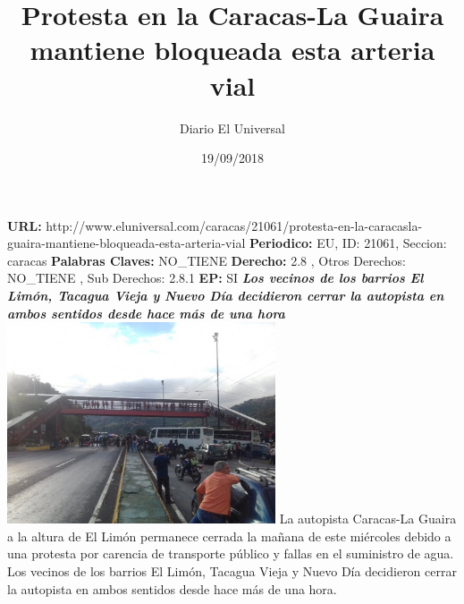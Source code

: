 \documentclass{article}%
\title{\textbf{Protesta en la Caracas{-}La Guaira mantiene bloqueada esta arteria vial}}%
\author{Diario El Universal}%
\date{19/09/2018}%
\begin{document}
%
\normalsize%
\maketitle%
\textbf{URL: }%
http://www.eluniversal.com/caracas/21061/protesta{-}en{-}la{-}caracasla{-}guaira{-}mantiene{-}bloqueada{-}esta{-}arteria{-}vial\newline%
%
\textbf{Periodico: }%
EU, %
ID: %
21061, %
Seccion: %
caracas\newline%
%
\textbf{Palabras Claves: }%
NO\_TIENE\newline%
%
\textbf{Derecho: }%
2.8%
, Otros Derechos: %
NO\_TIENE%
, Sub Derechos: %
2.8.1%
\newline%
%
\textbf{EP: }%
SI\newline%
\newline%
%
\textbf{\textit{Los vecinos de los barrios El Limón, Tacagua Vieja y Nuevo Día decidieron cerrar la autopista en ambos sentidos desde hace más de una hora}}%
\newline%
\newline%
%
\includegraphics[width=300px]{69.jpg}%
\newline%
%
La autopista Caracas{-}La Guaira a la altura de El Limón permanece cerrada la mañana de este miércoles debido a una protesta por carencia de transporte público y fallas en el suministro de agua.%
\newline%
%
Los vecinos de los barrios El Limón, Tacagua Vieja y Nuevo Día decidieron cerrar la autopista en ambos sentidos desde hace más de una hora.%
\newline%
%
\end{document}
